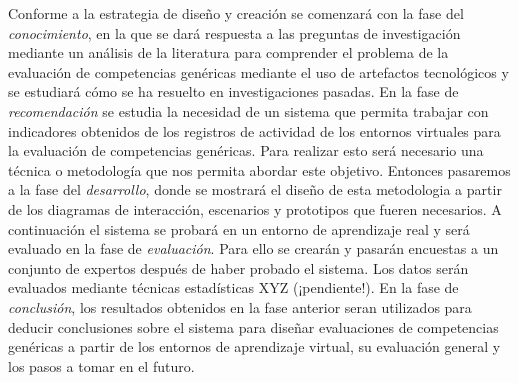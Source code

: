 Conforme a la estrategia de diseño y creación se comenzará con la fase del \emph{conocimiento}, en la que se dará respuesta a las preguntas de investigación mediante un análisis de la literatura para comprender el problema de la evaluación de competencias genéricas mediante el uso de artefactos tecnológicos y se estudiará cómo se ha resuelto en investigaciones pasadas. En la fase de \emph{recomendación} se estudia la necesidad de un sistema que permita trabajar con indicadores obtenidos de los registros de actividad de los entornos virtuales para la evaluación de competencias genéricas. Para realizar esto será necesario una técnica o metodología que nos permita abordar este objetivo. Entonces pasaremos a la fase del \emph{desarrollo}, donde se mostrará el diseño de esta metodologia a partir de los diagramas de interacción, escenarios y prototipos que fueren necesarios. A continuación el sistema se probará en un entorno de aprendizaje real y será evaluado en la fase de \emph{evaluación}. Para ello se crearán y pasarán encuestas a un conjunto de expertos después de haber probado el sistema. Los datos serán evaluados mediante técnicas estadísticas XYZ (¡pendiente!). En la fase de \emph{conclusión}, los resultados obtenidos en la fase anterior seran utilizados para deducir conclusiones sobre el sistema para diseñar evaluaciones de competencias genéricas a partir de los entornos de aprendizaje virtual, su evaluación general y los pasos a tomar en el futuro.



